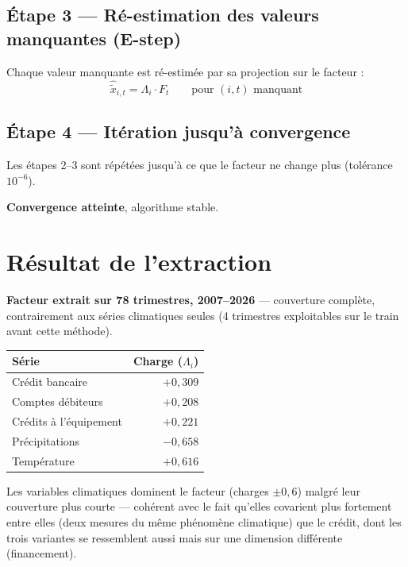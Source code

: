 \documentclass[11pt,a4paper]{article}
\begin{document}
\subsection{Étape 3 --- Ré-estimation des valeurs manquantes (E-step)}

Chaque valeur manquante est ré-estimée par sa projection sur le facteur :
\begin{equation}
\hat{\tilde{x}}_{i,t} = \Lambda_i \cdot F_t \qquad \text{pour } (i,t) \text{ manquant}
\end{equation}

\subsection{Étape 4 --- Itération jusqu'à convergence}

Les étapes 2--3 sont répétées jusqu'à ce que le facteur ne change plus (tolérance $10^{-6}$).

\begin{fichebox}
\textbf{Convergence atteinte}, algorithme stable.
\end{fichebox}

\section{Résultat de l'extraction}

\begin{fichebox}
\textbf{Facteur extrait sur 78 trimestres, 2007--2026} --- couverture complète, contrairement aux séries climatiques seules (4 trimestres exploitables sur le train avant cette méthode).

\begin{center}
\small
\begin{tabular}{lr}
\toprule
\textbf{Série} & \textbf{Charge ($\Lambda_i$)} \\
\midrule
Crédit bancaire & $+0{,}309$ \\
Comptes débiteurs & $+0{,}208$ \\
Crédits à l'équipement & $+0{,}221$ \\
Précipitations & $-0{,}658$ \\
Température & $+0{,}616$ \\
\bottomrule
\end{tabular}
\end{center}

Les variables climatiques dominent le facteur (charges $\pm0{,}6$) malgré leur couverture plus courte --- cohérent avec le fait qu'elles covarient plus fortement entre elles (deux mesures du même phénomène climatique) que le crédit, dont les trois variantes se ressemblent aussi mais sur une dimension différente (financement).
\end{fichebox}
\end{document}
